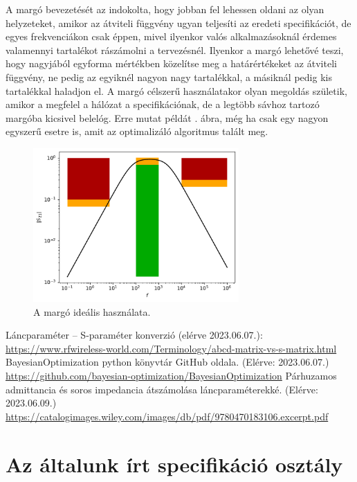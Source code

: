         A margó bevezetését az indokolta, hogy jobban fel lehessen oldani az olyan helyzeteket, amikor az átviteli függvény ugyan teljesíti az eredeti specifikációt, de egyes frekvenciákon csak éppen, mivel ilyenkor valós alkalmazásoknál érdemes valamennyi tartalékot rászámolni a tervezésnél. Ilyenkor a margó lehetővé teszi, hogy nagyjából egyforma mértékben közelítse meg a határértékeket az átviteli függvény, ne pedig az egyiknél nagyon nagy tartalékkal, a másiknál pedig kis tartalékkal haladjon el. A margó célszerű használatakor olyan megoldás születik, amikor a megfelel a hálózat a specifikációnak, de a legtöbb sávhoz tartozó margóba kicsivel belelóg. Erre mutat példát . ábra, még ha csak egy nagyon egyszerű esetre is, amit az optimalizáló algoritmus talált meg.
        \begin{figure}[h!]
            \centering
            \includegraphics[width=0.7\textwidth]{megoldas.pdf}
            \caption{A margó ideális használata.}
            \label{fig:megoldas}
        \end{figure}
%
\clearpage
\begin{thebibliography}{9}
     Láncparaméter -- S-paraméter konverzió (elérve 2023.06.07.): \url{https://www.rfwireless-world.com/Terminology/abcd-matrix-vs-s-matrix.html}
     BayesianOptimization python könyvtár GitHub oldala. (Elérve: 2023.06.07.) \url{https://github.com/bayesian-optimization/BayesianOptimization}
	 Párhuzamos admittancia és soros impedancia átszámolása láncparaméterekké. (Elérve: 2023.06.09.) \url{https://catalogimages.wiley.com/images/db/pdf/9780470183106.excerpt.pdf}
\end{thebibliography}

\clearpage
\appendix
\section{Az általunk írt specifikáció osztály}
	

